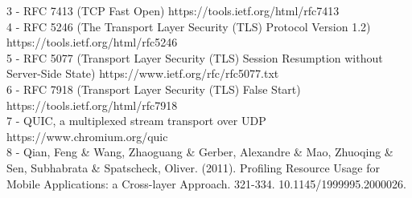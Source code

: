 \documentclass{article}
\begin{document}
3 - RFC 7413 (TCP Fast Open) https://tools.ietf.org/html/rfc7413 \\

4 - RFC 5246 (The Transport Layer Security (TLS) Protocol Version 1.2) https://tools.ietf.org/html/rfc5246 \\

5 - RFC 5077 (Transport Layer Security (TLS) Session Resumption without Server-Side State)
https://www.ietf.org/rfc/rfc5077.txt \\

6 - RFC 7918 (Transport Layer Security (TLS) False Start) https://tools.ietf.org/html/rfc7918 \\

7 - QUIC, a multiplexed stream transport over UDP https://www.chromium.org/quic \\

8 - Qian, Feng \& Wang, Zhaoguang \& Gerber, Alexandre \& Mao, Zhuoqing \& Sen, Subhabrata \& Spatscheck, Oliver. (2011). Profiling Resource Usage for Mobile Applications: a Cross-layer Approach. 321-334.  10.1145/1999995.2000026. \\
\end{document}
